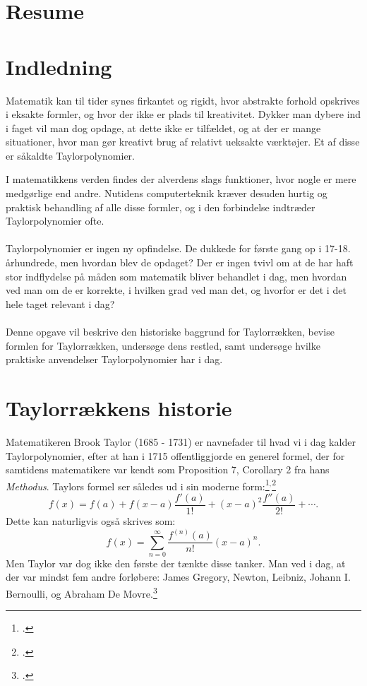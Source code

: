 \documentclass[12pt, a4paper]{article}
\begin{document}
\begin{refsection}
\section*{Resume} %
\blindtext[1-2]
\tableofcontents
\newpage



\section{Indledning} %
Matematik kan til tider synes firkantet og rigidt, hvor abstrakte forhold opskrives i eksakte formler, og hvor der ikke er plads til kreativitet. 
Dykker man dybere ind i faget vil man dog opdage, at dette ikke er tilfældet, og at der er mange situationer, hvor man gør kreativt brug af relativt ueksakte værktøjer. Et af disse er såkaldte Taylorpolynomier.


I matematikkens verden findes der alverdens slags funktioner, hvor nogle er mere medgørlige end andre. Nutidens computerteknik kræver desuden hurtig og praktisk behandling af alle disse formler, og i den forbindelse indtræder Taylorpolynomier ofte.\\
\\
Taylorpolynomier er ingen ny opfindelse. De dukkede for første gang op i 17-18. århundrede, men hvordan blev de opdaget? Der er ingen tvivl om at de har haft stor indflydelse på måden som matematik bliver behandlet i dag, men hvordan ved man om de er korrekte, i hvilken grad ved man det, og hvorfor er det i det hele taget relevant i dag?\\
\\
Denne opgave vil beskrive den historiske baggrund for Taylorrækken, bevise formlen for Taylorrækken, undersøge dens restled, samt undersøge hvilke praktiske anvendelser Taylorpolynomier har i dag.

\section{Taylorrækkens historie} %
Matematikeren Brook Taylor (1685 - 1731) er navnefader til hvad vi i dag kalder Taylorpolynomier, efter at han i 1715 offentliggjorde en generel formel, der for samtidens matematikere var kendt som Proposition 7, Corollary 2 fra hans \textit{Methodus}.
Taylors formel ser således ud i sin moderne form:\footcite[s. 247]{roy_2021}$^,$\footcite[s. 72]{feigenbaum_exact_sciences}
\begin{equation*}
   f(x)=f(a)+f(x-a)\frac{f'(a)}{1!}+(x-a)^2\frac{f''(a)}{2!}+\cdots. 
\end{equation*}
Dette kan naturligvis også skrives som:
\begin{equation*}
    f(x)=\sum_{n=0}^{\infty}\frac{f^{(n)}(a)}{n!}(x-a)^n.
\end{equation*}
Men Taylor var dog ikke den første der tænkte disse tanker. Man ved i dag, at der var mindst fem andre forløbere: James Gregory, Newton, Leibniz, Johann I. Bernoulli, og Abraham De Movre.\footcite{feigenbaum_exact_sciences}

\end{refsection}
\end{document}
